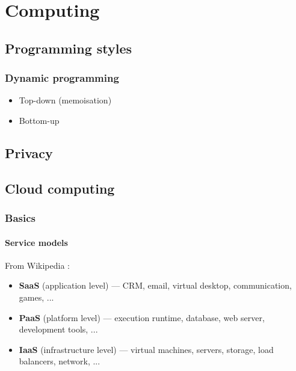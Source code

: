 \chapter{Computing}

\section{Programming styles}
\subsection{Dynamic programming}
\begin{itemize}
	\item Top-down (memoisation)
	\item Bottom-up
\end{itemize}

\section{Privacy}

\section{Cloud computing}

\subsection{Basics}

\subsubsection{Service models}

From Wikipedia \cite{wikipedia_cloud_computing}:
\begin{itemize}
	\item \textbf{SaaS} (application level) --- CRM, email, virtual desktop, communication, games, ...
	\item \textbf{PaaS} (platform level) --- execution runtime, database, web server, development tools, ...
	\item \textbf{IaaS} (infrastructure level) --- virtual machines, servers, storage, load balancers, network, ...
\end{itemize}

\printbibliography